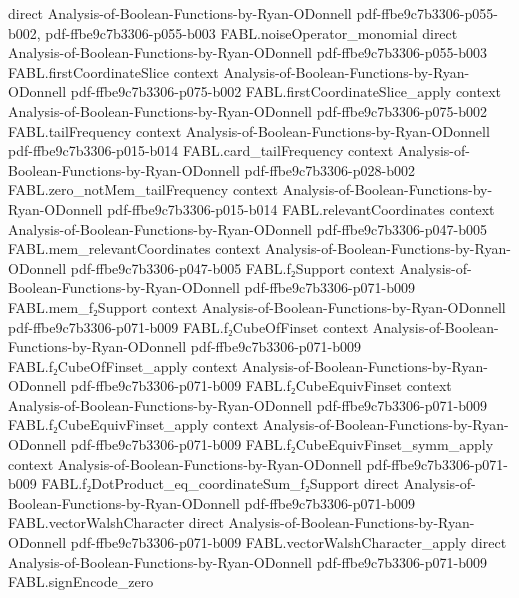 \begin{theorem}
  {direct}
  {Analysis-of-Boolean-Functions-by-Ryan-ODonnell}
  {pdf-ffbe9c7b3306-p055-b002,
    pdf-ffbe9c7b3306-p055-b003}
\proofstep
  {FABL.noiseOperator_monomial}
  {direct}
  {Analysis-of-Boolean-Functions-by-Ryan-ODonnell}
  {pdf-ffbe9c7b3306-p055-b003}
\proofstep
  {FABL.firstCoordinateSlice}
  {context}
  {Analysis-of-Boolean-Functions-by-Ryan-ODonnell}
  {pdf-ffbe9c7b3306-p075-b002}
\proofstep
  {FABL.firstCoordinateSlice_apply}
  {context}
  {Analysis-of-Boolean-Functions-by-Ryan-ODonnell}
  {pdf-ffbe9c7b3306-p075-b002}
\proofstep
  {FABL.tailFrequency}
  {context}
  {Analysis-of-Boolean-Functions-by-Ryan-ODonnell}
  {pdf-ffbe9c7b3306-p015-b014}
\proofstep
  {FABL.card_tailFrequency}
  {context}
  {Analysis-of-Boolean-Functions-by-Ryan-ODonnell}
  {pdf-ffbe9c7b3306-p028-b002}
\proofstep
  {FABL.zero_notMem_tailFrequency}
  {context}
  {Analysis-of-Boolean-Functions-by-Ryan-ODonnell}
  {pdf-ffbe9c7b3306-p015-b014}
\proofstep
  {FABL.relevantCoordinates}
  {context}
  {Analysis-of-Boolean-Functions-by-Ryan-ODonnell}
  {pdf-ffbe9c7b3306-p047-b005}
\proofstep
  {FABL.mem_relevantCoordinates}
  {context}
  {Analysis-of-Boolean-Functions-by-Ryan-ODonnell}
  {pdf-ffbe9c7b3306-p047-b005}
\proofstep
  {FABL.f₂Support}
  {context}
  {Analysis-of-Boolean-Functions-by-Ryan-ODonnell}
  {pdf-ffbe9c7b3306-p071-b009}
\proofstep
  {FABL.mem_f₂Support}
  {context}
  {Analysis-of-Boolean-Functions-by-Ryan-ODonnell}
  {pdf-ffbe9c7b3306-p071-b009}
\proofstep
  {FABL.f₂CubeOfFinset}
  {context}
  {Analysis-of-Boolean-Functions-by-Ryan-ODonnell}
  {pdf-ffbe9c7b3306-p071-b009}
\proofstep
  {FABL.f₂CubeOfFinset_apply}
  {context}
  {Analysis-of-Boolean-Functions-by-Ryan-ODonnell}
  {pdf-ffbe9c7b3306-p071-b009}
\proofstep
  {FABL.f₂CubeEquivFinset}
  {context}
  {Analysis-of-Boolean-Functions-by-Ryan-ODonnell}
  {pdf-ffbe9c7b3306-p071-b009}
\proofstep
  {FABL.f₂CubeEquivFinset_apply}
  {context}
  {Analysis-of-Boolean-Functions-by-Ryan-ODonnell}
  {pdf-ffbe9c7b3306-p071-b009}
\proofstep
  {FABL.f₂CubeEquivFinset_symm_apply}
  {context}
  {Analysis-of-Boolean-Functions-by-Ryan-ODonnell}
  {pdf-ffbe9c7b3306-p071-b009}
\proofstep
  {FABL.f₂DotProduct_eq_coordinateSum_f₂Support}
  {direct}
  {Analysis-of-Boolean-Functions-by-Ryan-ODonnell}
  {pdf-ffbe9c7b3306-p071-b009}
\proofstep
  {FABL.vectorWalshCharacter}
  {direct}
  {Analysis-of-Boolean-Functions-by-Ryan-ODonnell}
  {pdf-ffbe9c7b3306-p071-b009}
\proofstep
  {FABL.vectorWalshCharacter_apply}
  {direct}
  {Analysis-of-Boolean-Functions-by-Ryan-ODonnell}
  {pdf-ffbe9c7b3306-p071-b009}
\proofstep
  {FABL.signEncode_zero}

\end{theorem}
